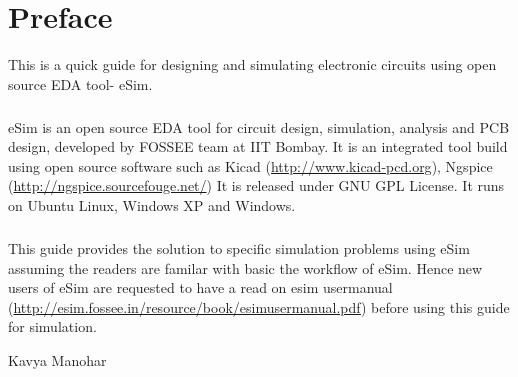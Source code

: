 \chapter*{Preface}

This is a quick guide for designing and simulating electronic circuits using open source  EDA tool- eSim. 
\paragraph{}

eSim is an open source EDA tool for circuit design, simulation, analysis and PCB design, developed by FOSSEE team at IIT Bombay. It is an integrated tool build using open source software such as Kicad (\url{http://www.kicad-pcd.org}), Ngspice (\url{http://ngspice.sourcefouge.net/}) It is released under GNU GPL License. It runs on Ubuntu Linux, Windows XP and Windows.

\paragraph{}
This guide provides the solution to specific simulation problems using eSim assuming the readers are familar with basic the workflow of eSim. Hence new users of eSim are requested to have a read on esim usermanual (\url{http://esim.fossee.in/resource/book/esimusermanual.pdf}) before using this guide for simulation.

\begin{flushright} Kavya Manohar \end{flushright}


